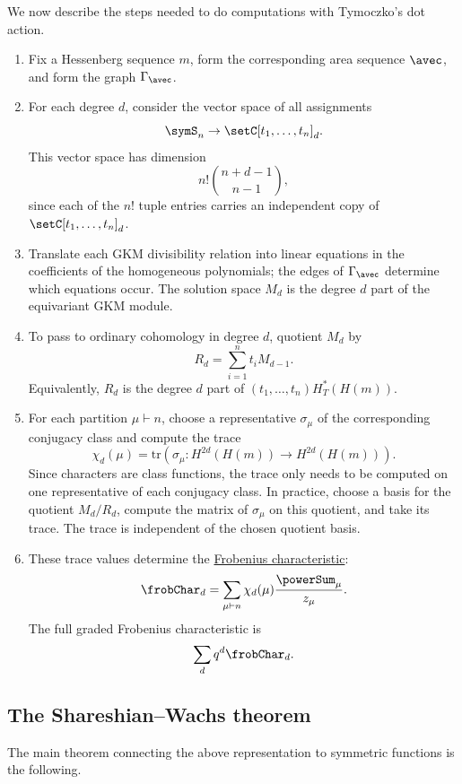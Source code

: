 We now describe the steps needed to do computations with Tymoczko's dot action.
\begin{enumerate}
\item
Fix a Hessenberg sequence $m$, form the corresponding area sequence $\avec$,
and form the graph $\Gamma_\avec$.

\item
For each degree $d$, consider the vector space of all assignments
\[
\symS_n \to \setC[t_1,\dotsc,t_n]_d.
\]
This vector space has dimension
\[
n!\binom{n+d-1}{n-1},
\]
since each of the $n!$ tuple entries carries an independent copy of
\(\setC[t_1,\dotsc,t_n]_d\).

\item
Translate each GKM divisibility relation into linear equations in the
coefficients of the homogeneous polynomials;
the edges of $\Gamma_\avec$ determine which equations occur.
The solution space $M_d$ is the degree $d$ part of the equivariant GKM module.


\item
To pass to ordinary cohomology in degree $d$, quotient $M_d$ by
\[
R_d=\sum_{i=1}^n t_i M_{d-1}.
\]
Equivalently, $R_d$ is the degree $d$ part of
$(t_1,\dotsc,t_n)H_T^\ast(H(m))$.

\item
For each partition $\mu\vdash n$, choose a representative $\sigma_\mu$ of the
corresponding conjugacy class and compute the trace
\[
\chi_d(\mu)
=
\mathrm{tr}\left(
\sigma_\mu:
H^{2d}(H(m))\to H^{2d}(H(m))
\right).
\]
Since characters are class functions, the trace only needs to be computed on
one representative of each conjugacy class.
In practice, choose a basis for the quotient $M_d/R_d$, compute the matrix of
$\sigma_\mu$ on this quotient, and take its trace.  The trace is independent
of the chosen quotient basis.

\item
These trace values determine the
\hyperref[computingSnCharacters]{Frobenius characteristic}:
\[
\frobChar_d
=
\sum_{\mu\vdash n}\chi_d(\mu)\frac{\powerSum_\mu}{z_\mu}.
\]
The full graded Frobenius characteristic is
\[
\sum_d q^d \frobChar_d.
\]
\end{enumerate}


\subsection[dotActionShareshianWachsTheorem]{The Shareshian--Wachs theorem}

The main theorem connecting the above representation to symmetric functions is
the following.

